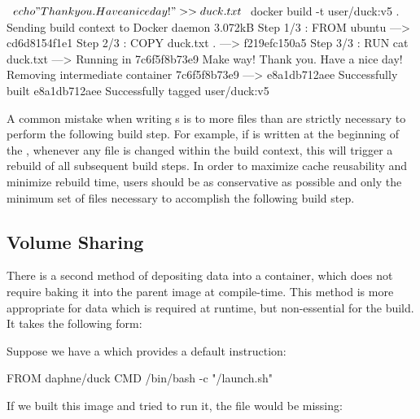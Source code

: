 \begin{pclisting}
~$ echo "Thank you. Have a nice day!" >> duck.txt
~$ docker build -t user/duck:v5 .
Sending build context to Docker daemon  3.072kB
Step 1/3 : FROM ubuntu
---> cd6d8154f1e1
Step 2/3 : COPY duck.txt .
---> f219efc150a5
Step 3/3 : RUN cat duck.txt
---> Running in 7c6f5f8b73e9
Make way!
Thank you. Have a nice day!
Removing intermediate container 7c6f5f8b73e9
---> e8a1db712aee
Successfully built e8a1db712aee
Successfully tagged user/duck:v5
\end{pclisting}
%
A common mistake when writing s is to  more files than are strictly necessary to perform the following build step. For example, if  is written at the beginning of the , whenever any file is changed within the build context, this will trigger a rebuild of all subsequent build steps. In order to maximize cache reusability and minimize rebuild time, users should be as conservative as possible and only  the minimum set of files necessary to accomplish the following build step.


\subsection{Volume Sharing}\label{subsec:volume_sharing}

There is a second method of depositing data into a container, which does not require baking it into the parent image at compile-time. This method is more appropriate for data which is required at runtime, but non-essential for the build. It takes the following form:

%
Suppose we have a  which provides a default  instruction:

\begin{dockerlisting}
FROM daphne/duck
CMD /bin/bash -c "/launch.sh"
\end{dockerlisting}
%
If we built this image and tried to run it, the file  would be missing:

